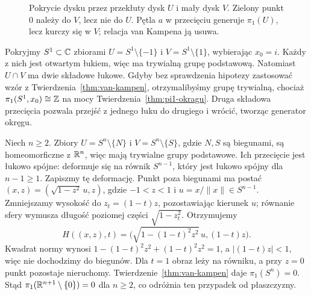 \begin{figure}[!htbp]
\centering
{}
\caption{Pokrycie dysku przez przekłuty dysk $U$ i mały dysk $V$.
Zielony punkt $0$ należy do $V$, lecz nie do $U$.
Pętla $a$ w przecięciu generuje $\pi_1(U)$,
lecz kurczy się w $V$; relacja van Kampena ją usuwa.}
\label{fig:van-kampen-dysk}
\end{figure}

\begin{uwaga}
Pokryjmy $S^1\subset\mathbb{C}$ zbiorami
$U=S^1\setminus\{-1\}$ i $V=S^1\setminus\{1\}$,
wybierając $x_0=i$. Każdy z nich jest otwartym łukiem,
więc ma trywialną grupę podstawową. Natomiast
$U\cap V$ ma dwie składowe łukowe.
Gdyby bez sprawdzenia hipotezy zastosować wzór
z Twierdzenia~\ref{thm:van-kampen}, otrzymalibyśmy
grupę trywialną, chociaż $\pi_1(S^1,x_0)\cong\mathbb{Z}$
na mocy Twierdzenia~\ref{thm:pi1-okragu}.
Druga składowa przecięcia pozwala przejść z jednego
łuku do drugiego i wrócić, tworząc generator okręgu.
\end{uwaga}

\begin{przyklad}
\label{prz:pi1-sfera}
Niech $n\geq2$. Zbiory
$U=S^n\setminus\{N\}$ i
$V=S^n\setminus\{S\}$, gdzie $N,S$
są biegunami, są homeomorficzne
z $\mathbb{R}^n$, więc mają trywialne
grupy podstawowe. Ich przecięcie
jest łukowo spójne: deformuje się
na równik $S^{n-1}$, który jest
łukowo spójny dla $n-1\geq1$.
Zapiszmy tę deformację. Punkt poza biegunami ma postać
$(x,z)=(\sqrt{1-z^2}\,u,z)$, gdzie $-1<z<1$ i
$u=x/\|x\|\in S^{n-1}$.
Zmniejszamy wysokość do $z_t=(1-t)z$,
pozostawiając kierunek $u$; równanie sfery wymusza długość
poziomej części $\sqrt{1-z_t^2}$.
Otrzymujemy
\[
 H((x,z),t)=\bigl(\sqrt{1-(1-t)^2z^2}\,u,(1-t)z\bigr).
\]
Kwadrat normy wynosi $1-(1-t)^2z^2+(1-t)^2z^2=1$,
a $|(1-t)z|<1$, więc nie dochodzimy do biegunów.
Dla $t=1$ obraz leży na równiku, a przy $z=0$ punkt pozostaje nieruchomy.
Twierdzenie~\ref{thm:van-kampen}
daje $\pi_1(S^n)=0$.
Stąd $\pi_1(\mathbb{R}^{n+1}\setminus\{0\})=0$
dla $n\geq2$, co odróżnia ten
przypadek od płaszczyzny.
\end{przyklad}


